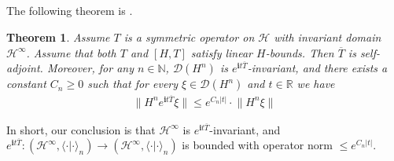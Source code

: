 \documentclass[12pt,b5paper,notitlepage]{article}
\theoremstyle{definition}
\theoremstyle{plain}
\newtheorem{thm}[df]{Theorem}
\newcommand{\mc}{\mathcal}
\newcommand{\ovl}{\overline}
\newcommand{\Dom}{\scr{D}}
\newcommand{\bk}[1]{\langle {#1}\rangle}
\newcommand{\scr}{\mathscr}
\newcommand{\im}{\mathbf{i}}
\newcommand{\Nbb}{\mathbb N}
\newcommand{\Rbb}{\mathbb R}
\numberwithin{equation}{section}
\begin{document}
\subsection{}


The following theorem is \cite[Prop. 2.1]{Tol99}.

\begin{thm}\label{lba9}
Assume $T$ is a symmetric operator on $\mc H$ with invariant domain $\mc H^\infty$. Assume that both $T$ and $[H,T]$ satisfy linear $H$-bounds. Then $\ovl T$ is self-adjoint. Moreover,  for any $n\in\Nbb$, $\Dom(H^n)$ is $e^{\im t\ovl T}$-invariant, and there exists a constant $C_n\geq 0$ such that for every  $\xi\in\Dom(H^n)$ and $t\in\Rbb$ we have
\begin{align}
\lVert H^n e^{\im t\ovl T}\xi\lVert\leq e^{C_n|t|}\cdot \lVert H^n\xi\lVert	\label{eqa11}
\end{align}
\end{thm}

In short, our conclusion is that $\mc H^\infty$ is $e^{\im t\ovl T}$-invariant, and $e^{\im t\ovl T}:(\mc H^\infty,\bk{\cdot|\cdot}_n)\rightarrow(\mc H^\infty,\bk{\cdot|\cdot}_n)$ is bounded with operator norm $\leq e^{C_n|t|}$. 
\end{document}
